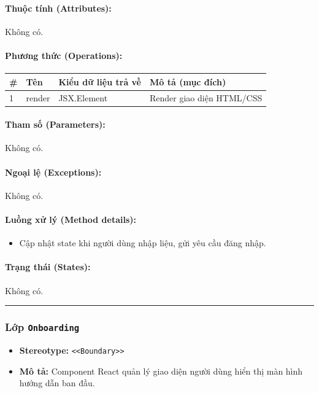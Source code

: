 \documentclass[12pt,a4paper]{article}
\begin{document}
\paragraph{Thuộc tính (Attributes):}
Không có.

\paragraph{Phương thức (Operations):}
\begin{longtable}{|p{0.6cm}|p{5.0cm}|p{2.8cm}|p{5.4cm}|}
\hline
\textbf{\#} & \textbf{Tên} & \textbf{Kiểu dữ liệu trả về} & \textbf{Mô tả (mục đích)} \\ \hline
\endhead
1 & render & JSX.Element & Render giao diện HTML/CSS \\ \hline
\end{longtable}

\paragraph{Tham số (Parameters):}
Không có.

\paragraph{Ngoại lệ (Exceptions):}
Không có.

\paragraph{Luồng xử lý (Method details):}
\begin{itemize}[leftmargin=*]
    \item Cập nhật state khi người dùng nhập liệu, gửi yêu cầu đăng nhập.
\end{itemize}


\paragraph{Trạng thái (States):}
Không có.

\vskip 0.5cm
\noindent\rule{\textwidth}{0.5pt}
\vskip 0.5cm

\subsubsection{Lớp \texttt{Onboarding}}

\begin{itemize}[leftmargin=*]
    \item \textbf{Stereotype:} \texttt{\textless{}\textless{}Boundary\textgreater{}\textgreater{}}
    \item \textbf{Mô tả:} Component React quản lý giao diện người dùng hiển thị màn hình hướng dẫn ban đầu.
\end{itemize}
\end{document}
